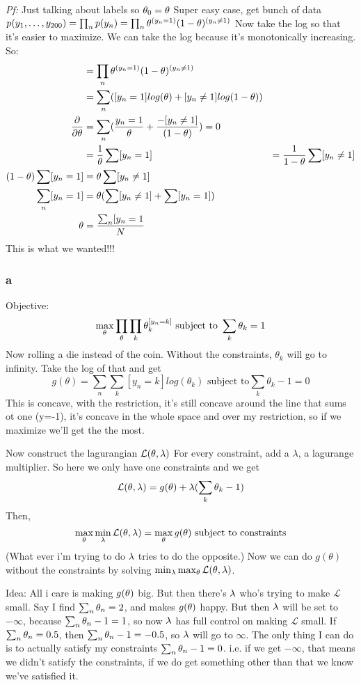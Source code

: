 \emph{Pf:}
Just talking about labels so $\theta_0=\theta$
Super easy case, get bunch of data
$p(y_1, \dots, y_{200}) = \prod_n p(y_n) = \prod_n
\theta^{(y_n=1)}(1-\theta)^{(y_n\neq 1)}$
Now take the log so that it's easier to maximize. We can take the log
because it's monotonically increasing.
So:
\begin{align*}
 &= \prod_n\theta^{(y_n=1)}(1-\theta)^{(y_n\neq 1)}\\
&= \sum_n([y_n=1]log(\theta) + [y_n\neq 1] log(1-\theta))\\
\frac{\partial}{\partial \theta}&= \sum_n( \frac{y_n=1}{\theta} +
\frac{-[y_n\neq 1]}{(1-\theta)}) = 0\\
&= \frac{1}{\theta}\sum[y_n=1] &= \frac{1}{1-\theta}\sum [y_n\neq 1]\\
(1-\theta)\sum[y_n=1] &=\theta \sum[y_n\neq 1]\\
\sum_n[y_n=1]&= \theta(\sum[y_n \neq 1] + \sum [y_n=1])\\
\theta &= \frac{\sum_n[y_n=1}{N}
\end{align*}
This is what we wanted!!!

\subsubsection{a}
Objective: 
$$\max_\theta \prod_\theta \prod_k \theta_k^{[y_n=k]} \text{ subject to
  }\sum_k \theta_k = 1$$
Now rolling a die instead of the coin. Without the constraints,
$\theta_k$ will go to infinity. Take the log of that and
get $$g(\theta) = \sum_n\sum_k[y_n=k]log(\theta_k) \text{ subject to
} \sum_k\theta_k-1 = 0$$
This is concave, with the restriction, it's still concave around the
line that sums ot one (y=-1), it's concave in the whole space and over
my restriction, so if we maximize we'll get the the most.

Now construct the lagurangian $\mathcal{L}(\theta, \lambda)$
For every constraint, add a $\lambda$, a lagurange multiplier. So here we only have
one constraints and we get
$$\mathcal{L}(\theta, \lambda) = g(\theta) + \lambda(\sum_k\theta_k - 1)$$
Then, 
$$\max_\theta \min_\lambda \mathcal{L}(\theta, \lambda) = \max_\theta
g(\theta) \text{ subject to constraints}$$
(What ever i'm trying to do $\lambda$ tries to do the opposite.)
Now we can do $g(\theta)$ without the constraints by solving
$\min_\lambda \max_\theta \mathcal{L}(\theta, \lambda)$.

Idea: All i care is making $g(\theta)$ big. But then there's $\lambda$
who's trying to make $\mathcal{L}$ small. Say I find $\sum_n \theta_n =
2$, and makes $g(\theta)$ happy. But then $\lambda$ will be set to
$-\infty$, because $\sum_n\theta_n - 1 = 1$, so now $\lambda$ has full
control on making $\mathcal{L}$ small.
If $\sum_n \theta_n = 0.5$, then $\sum_n \theta_n -1 = -0.5$, so $\lambda$
will go to $\infty$. The only thing I can do is to actually satisfy my
constraints $\sum_n  \theta_n -1 = 0$. i.e. if we get $-\infty$, that
means we didn't satisfy the constraints, if we do get something other
than that we know we've satisfied it.
\pagebreak

